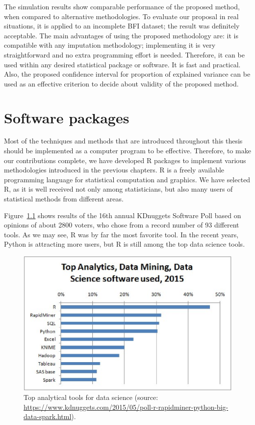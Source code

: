 \documentclass[11pt,a5paper,twoside]{book}
\begin{document}
The simulation results show comparable performance of the proposed method, when compared to alternative methodologies. To evaluate our proposal in real situations, it is applied to an incomplete BFI dataset; the result was definitely acceptable. The main advantages of using the proposed methodology are: it is compatible with any imputation methodology; implementing it is very straightforward and no extra programming effort is needed. Therefore, it can be used within any desired statistical package or software. It is fast and practical. Also, the proposed confidence interval for proportion of explained variance can be used as an effective criterion to decide about validity of the proposed method.


\chapter{Software packages}

\label{chap_software}
Most of the techniques and methods that are introduced throughout this thesis should be implemented as a computer program to be effective. Therefore, to make our contributions complete, we have developed R packages to implement various methodologies introduced in the previous chapters. R is a freely available programming language for statistical computation and graphics. We have selected R, as it is well received not only among statisticians, but also many users of statistical methods from different areas.

Figure~\ref{languages} shows results of the 16th annual KDnuggets Software Poll based on opinions of about 2800 voters, who chose from a record number of 93 different tools. As we may see, R was by far the most favorite tool. In the recent years, Python is attracting more users, but R is still among the top data science tools.


\begin{figure}[!t]
\centering
\includegraphics[width=\textwidth]{languages.eps}
\caption[Top analytical tools for data science]{\small \linespread{1.1} Top analytical tools for data science (source: \protect\url{https://www.kdnuggets.com/2015/05/poll-r-rapidminer-python-big-data-spark.html}).} \label{languages}
\end{figure}
\end{document}
